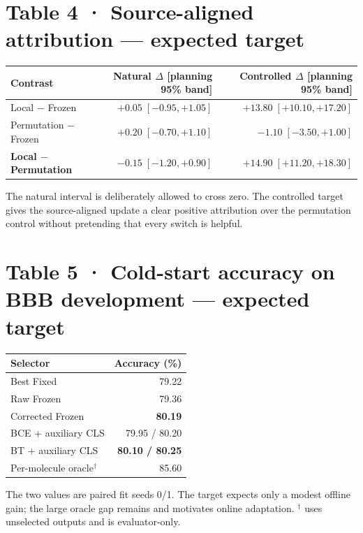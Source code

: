 \documentclass[10pt]{article}
\newcommand{\targetcell}[1]{\textbf{#1}}
\newcommand{\smallnote}[1]{{\footnotesize\color{Gray}#1}}
\begin{document}
\section*{Table 4 · Source-aligned attribution — expected target}
\begin{tabularx}{\linewidth}{@{}lrr@{}}
\toprule
Contrast & Natural $\Delta$ [planning 95\% band] & Controlled $\Delta$ [planning 95\% band] \\
\midrule
Local $-$ Frozen & $+0.05\;[-0.95,+1.05]$ & $+13.80\;[+10.10,+17.20]$ \\
Permutation $-$ Frozen & $+0.20\;[-0.70,+1.10]$ & $-1.10\;[-3.50,+1.00]$ \\
\textbf{Local $-$ Permutation} & $-0.15\;[-1.20,+0.90]$ & \targetcell{$+14.90\;[+11.20,+18.30]$} \\
\bottomrule
\end{tabularx}
\smallnote{The natural interval is deliberately allowed to cross zero. The controlled target gives the source-aligned update a clear positive attribution over the permutation control without pretending that every switch is helpful.}

\clearpage
\section*{Table 5 · Cold-start accuracy on BBB development — expected target}
\begin{tabularx}{\linewidth}{@{}lr@{}}
\toprule
Selector & Accuracy (\%) \\
\midrule
Best Fixed & 79.22 \\
Raw Frozen & 79.36 \\
Corrected Frozen & \targetcell{80.19} \\
\midrule
BCE + auxiliary CLS & 79.95 / 80.20 \\
BT + auxiliary CLS & \targetcell{80.10 / 80.25} \\
\midrule
Per-molecule oracle$^{\dagger}$ & 85.60 \\
\bottomrule
\end{tabularx}
\smallnote{The two values are paired fit seeds 0/1. The target expects only a modest offline gain; the large oracle gap remains and motivates online adaptation. $^{\dagger}$ uses unselected outputs and is evaluator-only.}
\end{document}
